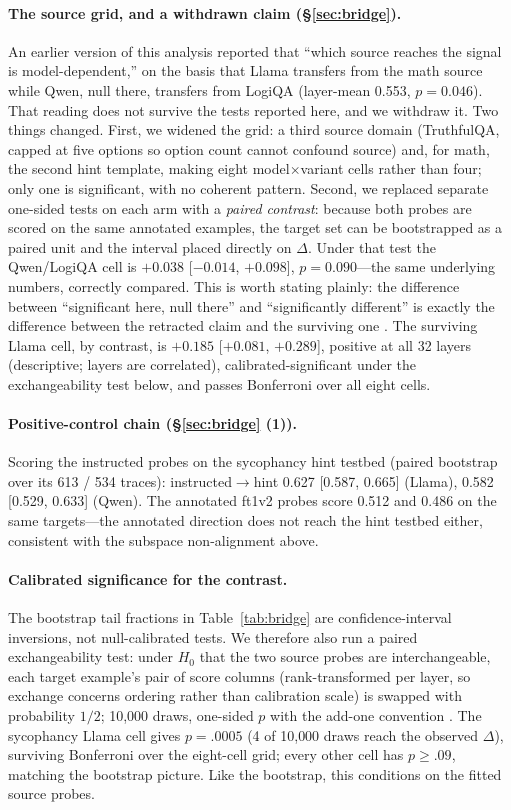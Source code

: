 \documentclass[11pt]{article}
\begin{document}
\paragraph{The source grid, and a withdrawn claim (\S\ref{sec:bridge}).} An earlier version of this analysis reported that ``which source reaches the signal is model-dependent,'' on the basis that Llama transfers from the math source while Qwen, null there, transfers from LogiQA (layer-mean 0.553, $p{=}0.046$). That reading does not survive the tests reported here, and we withdraw it. Two things changed. First, we widened the grid: a third source domain (TruthfulQA, capped at five options so option count cannot confound source) and, for math, the second hint template, making eight model$\times$variant cells rather than four; only one is significant, with no coherent pattern. Second, we replaced separate one-sided tests on each arm with a \emph{paired contrast}: because both probes are scored on the same annotated examples, the target set can be bootstrapped as a paired unit and the interval placed directly on $\Delta$. Under that test the Qwen/LogiQA cell is $+0.038$ [$-0.014$, $+0.098$], $p{=}0.090$---the same underlying numbers, correctly compared. This is worth stating plainly: the difference between ``significant here, null there'' and ``significantly different'' is exactly the difference between the retracted claim and the surviving one \citep{gelman2006difference}. The surviving Llama cell, by contrast, is $+0.185$ [$+0.081$, $+0.289$], positive at all 32 layers (descriptive; layers are correlated), calibrated-significant under the exchangeability test below, and passes Bonferroni over all eight cells.

\paragraph{Positive-control chain (\S\ref{sec:bridge} (1)).} Scoring the instructed probes on the sycophancy hint testbed (paired bootstrap over its 613 / 534 traces): instructed$\to$hint 0.627 [0.587, 0.665] (Llama), 0.582 [0.529, 0.633] (Qwen). The annotated ft1v2 probes score 0.512 and 0.486 on the same targets---the annotated direction does not reach the hint testbed either, consistent with the subspace non-alignment above.

\paragraph{Calibrated significance for the contrast.} The bootstrap tail fractions in Table~\ref{tab:bridge} are confidence-interval inversions, not null-calibrated tests. We therefore also run a paired exchangeability test: under $H_0$ that the two source probes are interchangeable, each target example's pair of score columns (rank-transformed per layer, so exchange concerns ordering rather than calibration scale) is swapped with probability $1/2$; 10{,}000 draws, one-sided $p$ with the add-one convention \citep{phipson2010permutation}. The sycophancy Llama cell gives $p{=}.0005$ (4 of 10{,}000 draws reach the observed $\Delta$), surviving Bonferroni over the eight-cell grid; every other cell has $p{\geq}.09$, matching the bootstrap picture. Like the bootstrap, this conditions on the fitted source probes.
\end{document}
